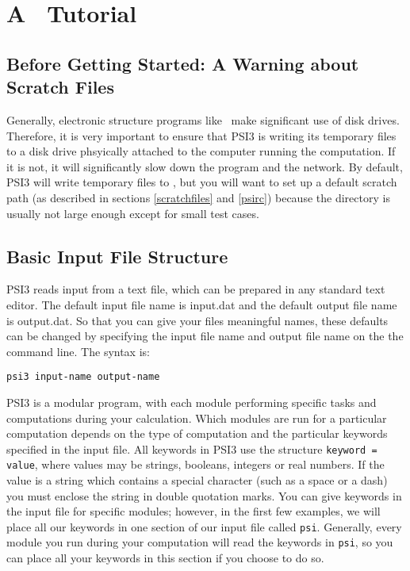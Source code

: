 \section{A \PSIthree\ Tutorial} \label{tutorial}

\subsection{Before Getting Started: A Warning about Scratch Files}
Generally, electronic structure programs like \PSIthree\ make
significant use of disk drives.  Therefore, it is very important
to ensure that PSI3 is writing its temporary files to a disk drive
phsyically attached to the computer running the computation.  If it
is not, it will significantly slow down the program and the network.
By default, PSI3 will write temporary files to , but you
will want to set up a default scratch path (as described in sections
\ref{scratchfiles} and \ref{psirc}) because the  directory
is usually not large enough except for small test cases.

\subsection{Basic Input File Structure} 

PSI3 reads input from a text file, which can be prepared in any standard
text editor.  The default input file name is input.dat and the default
output file name is output.dat.  So that you can give your files meaningful
names, these defaults can be changed by specifying the input file name and
output file name on the the command line.  The syntax is:

{\tt psi3 input-name output-name}

PSI3 is a modular program, with each module performing specific tasks
and computations during your calculation.  Which modules are run for
a particular computation depends on the type of computation and the
particular keywords specified in the input file.  All keywords in PSI3
use the structure {\tt keyword = value}, where values may be strings,
booleans, integers or real numbers.  If the value is a string which
contains a special character (such as a space or a dash) you must enclose
the string in double quotation marks.  You can give keywords in the
input file for specific modules; however, in the first few examples,
we will place all our keywords in one section of our input file called
{\tt psi}.  Generally, every module you run during your computation will
read the keywords in {\tt psi}, so you can place all your keywords in
this section if you choose to do so.


